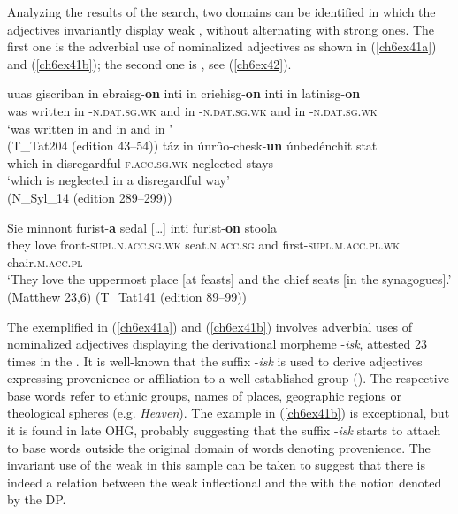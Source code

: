 \documentclass[output=paper,colorlinks,citecolor=brown]{langscibook}
\begin{document}
Analyzing the results of the  search, two domains can be
identified in which the adjectives invariantly display weak ,
without alternating with strong ones. The first one is the adverbial use
of nominalized adjectives as shown in (\ref{ch6ex41a}) and (\ref{ch6ex41b}); the second one is
, see (\ref{ch6ex42}).

\begin{exe}
\ex\label{ch6ex41}\begin{xlist}
\ex\label{ch6ex41a}
\gll uuas giscriban in ebraisg-\textbf{on} inti in criehisg-\textbf{on} inti in latinisg-\textbf{on}\\
was written in -\textsc{n.dat.sg.wk} and in -\textsc{n.dat.sg.wk} and in -\textsc{n.dat.sg.wk}\\
\glt `was written in  and in  and in '\\(T\_Tat204 (edition 43--54))
\ex\label{ch6ex41b} 
\gll táz in únrûo-chesk-\textbf{un} únbedénchit stat\\
which in disregardful-\textsc{f.acc.sg.wk} neglected stays\\
\glt `which is neglected in a disregardful way' \\ (N\_Syl\_14 (edition 289--299))
\end{xlist}
\end{exe}

\begin{exe}
\ex\label{ch6ex42}
\gll Sie minnont furist-\textbf{a} sedal {[}\ldots{]} inti furist-\textbf{on} stoola\\
 they love front-\textsc{supl.n.acc.sg.wk} seat.\textsc{n.acc.sg} {} and first-\textsc{supl.m.acc.pl.wk} chair.\textsc{m.acc.pl}\\
\glt `They love the uppermost place {[}at feasts{]} and the chief seats
  {[}in the synagogues{].}' (Matthew 23,6) (T\_Tat141 (edition 89--99))
\end{exe}

The  exemplified in (\ref{ch6ex41a}) and (\ref{ch6ex41b}) involves adverbial uses of
nominalized adjectives displaying the derivational morpheme -\emph{isk},
attested 23 times in the . It is well-known that the suffix
-\emph{isk} is used to derive adjectives expressing provenience or
affiliation to a well-established group (\cite[304]{Braune2018AHD}). The
respective base words refer to ethnic groups, names of places,
geographic regions or theological spheres (e.g. \emph{Heaven}). The
example in (\ref{ch6ex41b}) is exceptional, but it is found in late OHG, probably
suggesting that the suffix -\emph{isk} starts to attach to base words
outside the original domain of words denoting provenience. The invariant
use of the weak  in this sample can be taken to suggest that
there is indeed a relation between the weak inflectional  and the
 with the notion denoted by the DP.
\end{document}
